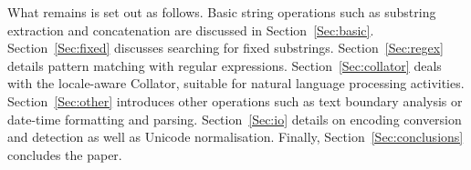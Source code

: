 \documentclass[nojss]{jss}
\begin{document}
%

%







\medskip
What remains is set out as follows.
Basic string operations such as substring extraction and concatenation
are discussed in Section~\ref{Sec:basic}.
Section~\ref{Sec:fixed} discusses searching for fixed substrings.
Section~\ref{Sec:regex} details pattern matching with  regular expressions.
Section~\ref{Sec:collator} deals with the locale-aware  Collator,
suitable for natural language processing activities.
Section~\ref{Sec:other} introduces other operations such as text boundary analysis
or date-time formatting and parsing.
Section~\ref{Sec:io} details on encoding conversion and detection
as well as Unicode normalisation.
Finally, Section~\ref{Sec:conclusions} concludes the paper.
\end{document}
